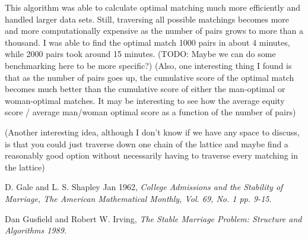 \documentclass[a4paper]{article}
\begin{document}
This algorithm was able to calculate optimal matching much more efficiently and handled larger data sets. Still, traversing all possible matchings becomes more and more computationally expensive as the number of pairs grows to more than a thousand. I was able to find the optimal match 1000 pairs in about 4 minutes, while 2000 pairs took around 15 minutes. (TODO: Maybe we can do some benchmarking here to be more specific?) (Also, one interesting thing I found is that as the number of pairs goes up, the cumulative score of the optimal match becomes much better than the cumulative score of either the man-optimal or woman-optimal matches. It may be interesting to see how the average equity score / average man/woman optimal score as a function of the number of pairs)

(Another interesting idea, although I don't know if we have any space to discuss, is that you could just traverse down one chain of the lattice and maybe find a reasonably good option without necessarily having to traverse every matching in the lattice)

\begin{thebibliography}{9}
  D. Gale and L. S. Shapley Jan 1962,
  \emph{College Admissions and the Stability of Marriage, The American Mathematical Monthly, Vol. 69, No. 1 pp. 9-15}.

  Dan Gusfield and Robert W. Irving,
  \emph{The Stable Marriage Problem: Structure and Algorithms 1989}.

\end{thebibliography}
\end{document}
